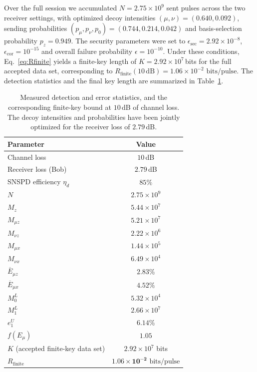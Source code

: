 \documentclass[pra,aps,reprint,nofootinbib,superscriptaddress,floatfix]{revtex4-2}
\newcommand{\bps}{\,\mathrm{bits/pulse}}
\begin{document}
Over the full session we accumulated $N = 2.75 \times 10^9$ sent pulses across the two receiver settings, with optimized decoy intensities $(\mu, \nu) = (0.640, 0.092)$, sending probabilities $(p_\mu, p_\nu, p_0) = (0.744, 0.214, 0.042)$ and basis-selection probability $p_z = 0.949$. The security parameters were set to $\epsilon_{\mathrm{sec}} = 2.92 \times 10^{-8}$, $\epsilon_{\mathrm{cor}} = 10^{-15}$ and overall failure probability $\epsilon = 10^{-10}$. Under these conditions, Eq.~\eqref{eq:Rfinite} yields a finite-key length of $K = 2.92 \times 10^{7}\,$bits for the full accepted data set, corresponding to $R_{\mathrm{finite}}(10\,\mathrm{dB}) = 1.06\times 10^{-2}\,\bps$. The detection statistics and the final key length are summarized in Table~\ref{tab:finite}.

\begin{table}[t]
\centering
\caption{Measured detection and error statistics, and the corresponding finite-key bound at $10\,$dB of channel loss. The decoy intensities and probabilities have been jointly optimized for the receiver loss of $2.79\,$dB.}
\label{tab:finite}
\begin{tabular}{lc}
\toprule
Parameter & Value \\
\midrule
Channel loss               & $10\,$dB \\
Receiver loss (Bob)        & $2.79\,$dB \\
SNSPD efficiency $\eta_d$  & $85\%$ \\
\midrule
$N$                        & $2.75\times10^{9}$ \\
$M_z$                      & $5.44\times10^{7}$ \\
$M_{\mu z}$                & $5.21\times10^{7}$ \\
$M_{\nu z}$                & $2.22\times10^{6}$ \\
$M_{\mu x}$                & $1.44\times10^{5}$ \\
$M_{\nu x}$                & $6.49\times10^{4}$ \\
$\overline{E}_{\mu z}$     & $2.83\%$ \\
$\overline{E}_{\mu x}$     & $4.52\%$ \\
$M_0^L$                    & $5.32\times10^{4}$ \\
$M_1^L$                    & $2.66\times10^{7}$ \\
$e_1^U$                    & $6.14\%$ \\
$f(E_\mu)$                 & $1.05$ \\
\midrule
$K$ (accepted finite-key data set)  & $2.92\times10^{7}$ bits \\
$R_{\mathrm{finite}}$      & $\bm{1.06\times10^{-2}\,\bps}$ \\
\bottomrule
\end{tabular}
\end{table}
\end{document}
